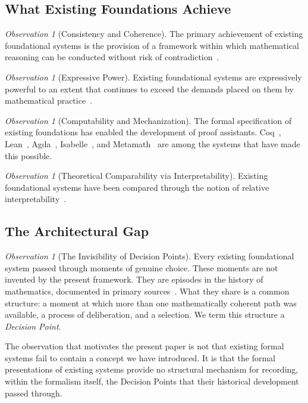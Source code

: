 \documentclass[12pt, a4paper]{article}
\theoremstyle{plain}
\theoremstyle{definition}
\theoremstyle{remark}
\newtheorem{observation}[theorem]{Observation}
\begin{document}
\subsection{What Existing Foundations Achieve}
\label{subsec:achieve}

\begin{observation}[Consistency and Coherence]
\label{obs:consistency}
The primary achievement of existing foundational systems is the
provision of a framework within which mathematical reasoning can
be conducted without risk of contradiction~\cite{Goedel1931,Goedel1938}.
\end{observation}

\begin{observation}[Expressive Power]
\label{obs:expressive}
Existing foundational systems are expressively powerful to an
extent that continues to exceed the demands placed on them by
mathematical practice~\cite{Jech2003,MartinLof1984}.
\end{observation}

\begin{observation}[Computability and Mechanization]
\label{obs:mechanization}
The formal specification of existing foundations has enabled the
development of proof assistants.
Coq~\cite{Coq2023}, Lean~\cite{deMouraEtAl2015},
Agda~\cite{Norell2007}, Isabelle~\cite{NipkowEtAl2002},
and Metamath~\cite{Megill1997} are among the systems that have
made this possible.
\end{observation}

\begin{observation}[Theoretical Comparability via Interpretability]
\label{obs:interpretability}
Existing foundational systems have been compared through the
notion of relative interpretability~\cite{Shoenfield1967,Kunen1980}.
\end{observation}

\subsection{The Architectural Gap}
\label{subsec:gap}

\begin{observation}[The Invisibility of Decision Points]
\label{obs:invisibility}
Every existing foundational system passed through moments of
genuine choice. These moments are not invented by the present
framework. They are episodes in the history of mathematics,
documented in primary sources~\cite{Moore1982,vanHeijenoort1967,Zermelo1904}.
What they share is a common structure: a moment at which more
than one mathematically coherent path was available, a process
of deliberation, and a selection. We term this structure a
\emph{Decision Point}.

The observation that motivates the present paper is not that
existing formal systems fail to contain a concept we have
introduced. It is that the formal presentations of existing
systems provide no structural mechanism for recording, within
the formalism itself, the Decision Points that their historical
development passed through.
\end{observation}
\end{document}
